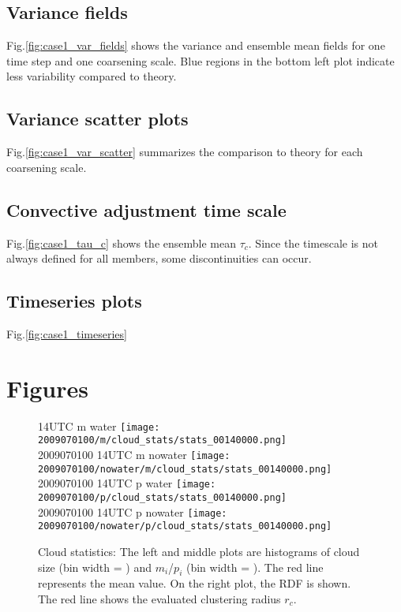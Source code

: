 \documentclass[a4paper, 12pt]{article}
\begin{document}
\subsection{Variance fields}
Fig.\ref{fig:case1_var_fields} shows the variance and ensemble mean fields for one time step and one coarsening scale. Blue regions in the bottom left plot indicate less variability compared to theory.

\subsection{Variance scatter plots}
Fig.\ref{fig:case1_var_scatter} summarizes the comparison to theory for each coarsening scale.

\subsection{Convective adjustment time scale}
Fig.\ref{fig:case1_tau_c} shows the ensemble mean $\tau_c$. Since the timescale is not always defined for all members, some discontinuities can occur. 

\subsection{Timeseries plots}
Fig.\ref{fig:case1_timeseries}




\newpage

{\small
 }

\newpage
\section{Figures}


\begin{figure}[ht] \label{fig:case1_stats}
\noindent {} 14UTC m water
\texttt{[image: 2009070100/m/cloud\_stats/stats\_00140000.png]}\\
2009070100 14UTC m nowater
\texttt{[image: 2009070100/nowater/m/cloud\_stats/stats\_00140000.png]}\\
2009070100 14UTC p water
\texttt{[image: 2009070100/p/cloud\_stats/stats\_00140000.png]}\\
2009070100 14UTC p nowater
\texttt{[image: 2009070100/nowater/p/cloud\_stats/stats\_00140000.png]}\\
\caption{Cloud statistics: The left and middle plots are histograms of cloud size (bin width = ) and $m_i$/$p_i$ (bin width = ). The red line represents the mean value. On the right plot, the RDF is shown. The red line shows the evaluated clustering radius $r_c$.}
\end{figure}
\end{document}
